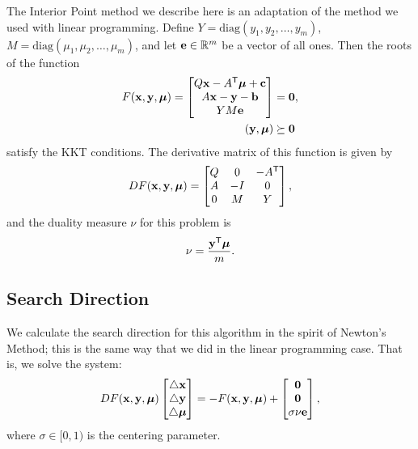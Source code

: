 The Interior Point method we describe here is an adaptation of the method we used with linear programming.
Define $Y = \text{diag}(y_1,y_2,\ldots,y_m)$, $M = \text{diag}(\mu_1,\mu_2,\ldots,\mu_m)$, and let $\mathbf{e}\in\mathbb{R}^m$ be a vector of all ones.
Then the roots of the function
\begin{align*}
F(\mathbf{x},\mathbf{y},\boldsymbol{\mu}) =
\begin{bmatrix}
Q\mathbf{x}-A^{\mathsf T} \boldsymbol{\mu} + \mathbf{c}\\
A\mathbf{x}-\mathbf{y}-\mathbf{b}\\
YM\mathbf{e}
\end{bmatrix}
&= \mathbf{0},\\
(\mathbf{y},\boldsymbol{\mu}) &\succeq \mathbf{0}
\end{align*}
satisfy the KKT conditions.
The derivative matrix of this function is given by
\[
DF(\mathbf{x},\mathbf{y},\boldsymbol{\mu}) =
\begin{bmatrix}
Q & 0 & -A^{\mathsf T} \\
A & -I & 0\\
0 & M & Y
\end{bmatrix},
\]
and the duality measure $\nu$ for this problem is \[\nu = \frac{\mathbf{y}^{\mathsf T} \boldsymbol{\mu}}{m}.\]

\subsection*{Search Direction}

We calculate the search direction for this algorithm in the spirit of Newton's Method; this is the same way that we did in the linear programming case.
That is, we solve the system:
\begin{align}
DF(\mathbf{x},\mathbf{y},\boldsymbol{\mu})
\begin{bmatrix}\triangle \mathbf{x}\\ \triangle \mathbf{y}\\ \triangle \boldsymbol{\mu}\end{bmatrix}
= - F(\mathbf{x},\mathbf{y},\boldsymbol{\mu}) +
\begin{bmatrix} \mathbf{0} \\ \mathbf{0} \\ \sigma\nu\mathbf{e} \end{bmatrix},
\label{eq:searchDirection}
\end{align}
where $\sigma\in [0,1)$ is the centering parameter.

